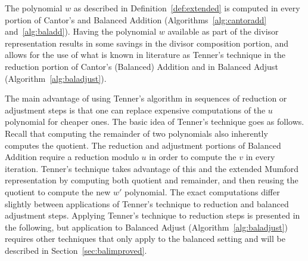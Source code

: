 The polynomial $w$ as described in Definition~\ref{def:extended} is computed in
every portion of Cantor's and Balanced Addition (Algorithms~\ref{alg:cantoradd}
and~\ref{alg:baladd}). Having the polynomial $w$ available as part of the
divisor representation results in some savings in the divisor composition
portion, and allows for the use of what is known in literature as Tenner's
technique in the reduction portion of Cantor's (Balanced) Addition and in
Balanced Adjust (Algorithm~\ref{alg:baladjust}).

The main advantage of using Tenner's algorithm in sequences of reduction or
adjustment steps is that one can replace expensive computations of the $u$
polynomial for cheaper ones. The basic idea of Tenner's technique goes as
follows. Recall that computing the remainder of two polynomials also inherently
computes the quotient. The reduction and adjustment portions of Balanced
Addition require a reduction modulo $u$ in order to compute the $v$ in every
iteration. Tenner's technique takes advantage of this and the extended Mumford
representation by computing both quotient and remainder, and then reusing the
quotient to compute the new $w'$ polynomial. The exact computations differ
slightly between applications of Tenner's technique to reduction and balanced
adjustment steps. Applying Tenner's technique to reduction steps is presented in
the following, but application to Balanced Adjust (Algorithm~\ref{alg:baladjust})
requires other techniques that only apply to the balanced setting and will be
described in Section~\ref{sec:balimproved}.

